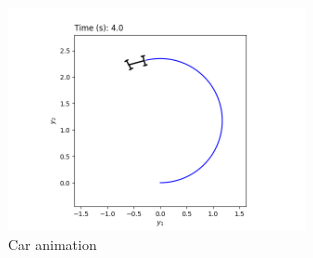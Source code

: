 \documentclass[a4paper,11pt,headings=standardclasses]{scrartcl}%
\begin{document}
\newpage
\begin{figure}[ht]
	\centering
	\includegraphics[width=0.7\textwidth]{img/animation}
	\caption{Car animation}
	\label{fig:animation}
\end{figure}


\newpage
\end{document}
